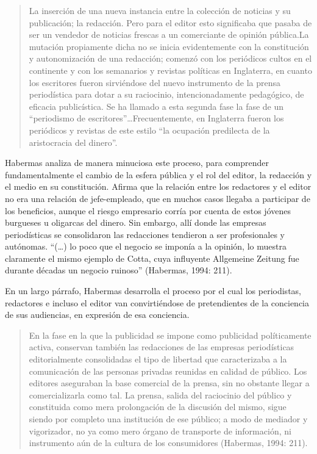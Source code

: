 \begin{quote}
La inserción de una nueva instancia entre la colección de noticias y su publicación; la redacción. Pero para el editor esto significaba que pasaba de ser un vendedor de noticias frescas a un comerciante de opinión pública.La mutación propiamente dicha no se inicia evidentemente con la constitución y autonomización de una redacción; comenzó con los periódicos cultos en el continente y con los semanarios y revistas políticas en Inglaterra, en cuanto los escritores fueron sirviéndose del nuevo instrumento de la prensa periodística para dotar a su raciocinio, intencionadamente pedagógico, de eficacia publicística. Se ha llamado a esta segunda fase la fase de un \enquote{periodismo de escritores}\ldots Frecuentemente, en Inglaterra fueron los periódicos y revistas de este estilo \enquote{la ocupación predilecta de la aristocracia del dinero}.
\end{quote}

Habermas analiza de manera minuciosa este proceso, para comprender fundamentalmente el cambio de la esfera pública y el rol del editor, la redacción y el medio en su constitución. Afirma que la relación entre los redactores y el editor no era una relación de jefe-empleado, que en muchos casos llegaba a participar de los beneficios, aunque el riesgo empresario corría por cuenta de estos jóvenes burgueses u oligarcas del dinero. Sin embargo, allí donde las empresas periodísticas se consolidaron las redacciones tendieron a ser profesionales y autónomas. \enquote{(\ldots) lo poco que el negocio se imponía a la opinión, lo muestra claramente el mismo ejemplo de Cotta, cuya influyente Allgemeine Zeitung fue durante décadas un negocio ruinoso} (Habermas, 1994: 211).

En un largo párrafo, Habermas desarrolla el proceso por el cual los periodistas, redactores e incluso el editor van convirtiéndose de pretendientes de la conciencia de sus audiencias, en expresión de esa conciencia.

\begin{quote}
En la fase en la que la publicidad se impone como publicidad políticamente activa, conservan también las redacciones de las empresas periodísticas editorialmente consolidadas el tipo de libertad que caracterizaba a la comunicación de las personas privadas reunidas en calidad de público. Los editores aseguraban la base comercial de la prensa, sin no obstante llegar a comercializarla como tal. La prensa, salida del raciocinio del público y constituida como mera prolongación de la discusión del mismo, sigue siendo por completo una institución de ese público; a modo de mediador y vigorizador, no ya como mero órgano de transporte de información, ni instrumento aún de la cultura de los consumidores (Habermas, 1994: 211).
\end{quote}

